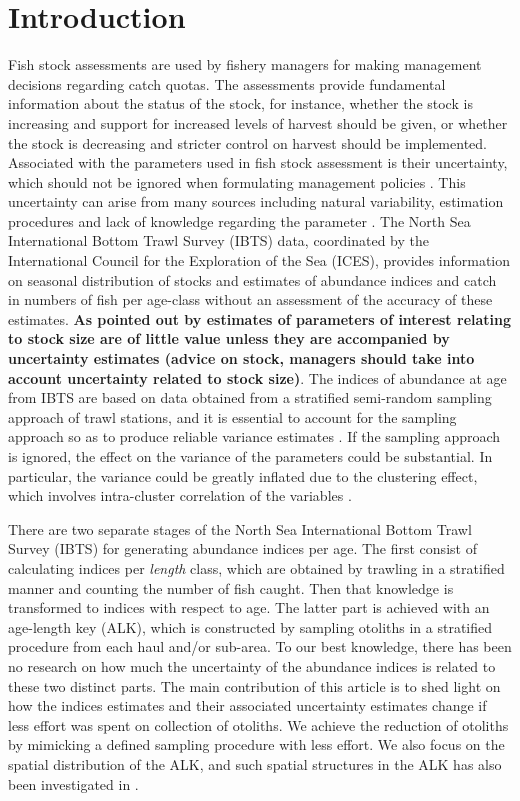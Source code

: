 \documentclass[a4paper 12pt]{article}
\numberwithin{equation}{section}
\begin{document}
\section{Introduction}
Fish stock assessments are used by fishery managers for making management decisions regarding catch quotas. The assessments provide fundamental information about the status of the stock, for instance, whether the stock is increasing and support for increased levels of harvest should be given, or whether the stock is decreasing and stricter control on harvest should be implemented. Associated with the parameters used in fish stock assessment is their uncertainty, which should not be ignored when formulating management policies \citep{walters1981effects, ludwig1981measurement, berg2014evaluation}. This uncertainty can arise from many sources including natural variability, estimation procedures and lack of knowledge regarding the parameter \citep{ehrhardt1997role}. The North Sea International Bottom Trawl Survey (IBTS) data, coordinated by the International Council for the Exploration of the Sea (ICES), provides information on seasonal distribution of stocks and estimates of abundance indices and catch in numbers of fish per age-class without an assessment of the accuracy of these estimates.  {\bf As pointed out by  \citet{ludwig1981measurement} estimates of parameters of interest relating to stock size are of little value unless they are accompanied by uncertainty estimates (advice on stock, managers should take into account uncertainty related to stock size)}. The indices of abundance at age from IBTS  are based on data obtained from a stratified semi-random sampling approach of trawl stations,  and  it is essential to account for the sampling approach so as to produce reliable variance estimates \citep{lehtonen2004practical}. If the sampling approach is ignored, the effect on the variance  of the parameters could be substantial.  In particular, the variance could be greatly inflated  due to the clustering effect, which involves intra-cluster correlation of the variables \citep{aanes2015efficient, lehtonen2004practical}. 

There are two separate stages of the North Sea International Bottom Trawl Survey (IBTS) for generating abundance indices per age.  The first consist of calculating indices per \textit{length} class, which are obtained by trawling in a stratified manner and counting the number of fish caught. Then that knowledge is transformed to indices with respect to age. The latter part is achieved with an age-length key (ALK), which is constructed by sampling otoliths in a stratified procedure from each haul and/or sub-area. To our best knowledge, there has been no research on how much the uncertainty of the abundance indices is related to these two distinct parts. The main contribution of this article is to shed light on how the indices estimates and their associated uncertainty estimates change if less effort was spent on collection of otoliths. We achieve the reduction of otoliths by mimicking a defined sampling procedure with less effort. We also focus on the spatial distribution of the ALK, and such spatial structures in the ALK has also been investigated in \citet{berg2012spatial, hirst2012bayesian}.
\end{document}
